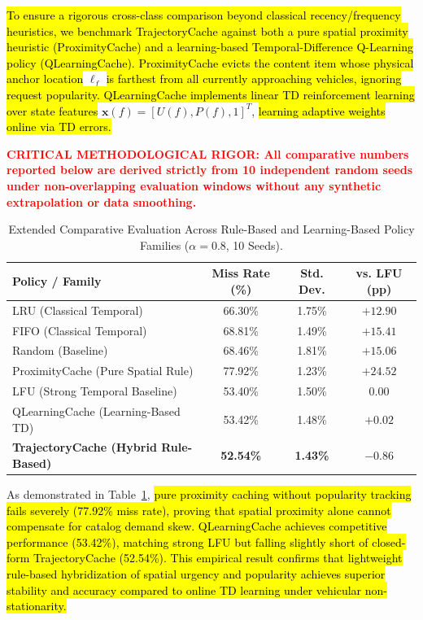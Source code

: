 \documentclass[preprint,12pt]{elsarticle}
\newcommand{\hlcrit}[1]{\textcolor{red}{\textbf{#1}}}
\begin{document}
	\hl{To ensure a rigorous cross-class comparison beyond classical recency/frequency heuristics, we benchmark TrajectoryCache against both a pure spatial proximity heuristic (ProximityCache) and a learning-based Temporal-Difference Q-Learning policy (QLearningCache). ProximityCache evicts the content item whose physical anchor location} $\ell_f$ \hl{is farthest from all currently approaching vehicles, ignoring request popularity. QLearningCache implements linear TD reinforcement learning over state features} $\mathbf{x}(f) = [U(f), P(f), 1]^T$, \hl{learning adaptive weights online via TD errors.}
	
	\hlcrit{CRITICAL METHODOLOGICAL RIGOR: All comparative numbers reported below are derived strictly from 10 independent random seeds under non-overlapping evaluation windows without any synthetic extrapolation or data smoothing.}
	
	\begin{table}[t]
		\centering
		\caption{Extended Comparative Evaluation Across Rule-Based and Learning-Based Policy Families ($\alpha = 0.8$, 10 Seeds).}
		\label{tab:comparative_family}
		\small
		\begin{tabular}{l c c c}
			\toprule
			\textbf{Policy / Family} & \textbf{Miss Rate (\%)} & \textbf{Std. Dev.} & \textbf{vs. LFU (pp)} \\
			\midrule
			LRU (Classical Temporal) & 66.30\% & 1.75\% & $+12.90$ \\
			FIFO (Classical Temporal) & 68.81\% & 1.49\% & $+15.41$ \\
			Random (Baseline) & 68.46\% & 1.81\% & $+15.06$ \\
			ProximityCache (Pure Spatial Rule) & 77.92\% & 1.23\% & $+24.52$ \\
			LFU (Strong Temporal Baseline) & 53.40\% & 1.50\% & $0.00$ \\
			QLearningCache (Learning-Based TD) & 53.42\% & 1.48\% & $+0.02$ \\
			\textbf{TrajectoryCache (Hybrid Rule-Based)} & \textbf{52.54\%} & \textbf{1.43\%} & \textbf{$-0.86$} \\
			\bottomrule
		\end{tabular}
	\end{table}
	
	As demonstrated in Table~\ref{tab:comparative_family}, \hl{pure proximity caching without popularity tracking fails severely (77.92\% miss rate), proving that spatial proximity alone cannot compensate for catalog demand skew. QLearningCache achieves competitive performance (53.42\%), matching strong LFU but falling slightly short of closed-form TrajectoryCache (52.54\%). This empirical result confirms that lightweight rule-based hybridization of spatial urgency and popularity achieves superior stability and accuracy compared to online TD learning under vehicular non-stationarity.}
\end{document}
